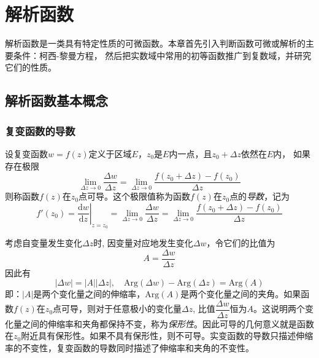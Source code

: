 \chapter{解析函数}
解析函数是一类具有特定性质的可微函数。本章首先引入判断函数可微或解析的主要条件：柯西-黎曼方程， 然后把实数域中常用的初等函数推广到复数域，并研究它们的性质。

\section{解析函数基本概念}\label{}

\subsection{复变函数的导数}

\begin{definition}
    \label{}\index{}
    设复变函数$w = f(z)$定义于区域$E$，$z_0$是$E$内一点，且$z_0 + \Delta z$依然在$E$内，
    如果存在极限
    \begin{equation}
        \lim_{\Delta z \to 0} \frac{\Delta w}{\Delta z}= \lim_{\Delta z \to 0}  \frac{f(z_0 +  \Delta z) - f(z_0)}{\Delta z}
    \end{equation}
   则称函数$f(z)$在$z_0$点可导。这个极限值称为函数$f(z)$在$z_0$点的\emph{导数}，记为
    \begin{equation}
        f'(z_0) = \left.\frac{\mathrm{d} w }{\mathrm{d} z} \right|_{z=z_0} = \lim_{\Delta z \to 0} \frac{\Delta w}{\Delta z}= \lim_{\Delta z \to 0}  \frac{f(z_0 +  \Delta z) - f(z_0)}{\Delta z}
    \end{equation}
\end{definition}
考虑自变量发生变化$\Delta z$时, 因变量对应地发生变化$\Delta w$，令它们的比值为
\[ A = \frac{\Delta w}{\Delta z}\]
因此有 
\[ |\Delta w| = |A| |\Delta z|, \quad \text{Arg}(\Delta w) -\text{Arg}(\Delta z) = \text{Arg}(A)  \]
即：$|A|$是两个变化量之间的伸缩率，$\text{Arg}(A) $是两个变化量之间的夹角。如果函数$f(z)$在$z_0$点可导，则对于任意极小的变化量$\Delta z$, 比值$\dfrac{\Delta w}{\Delta z}$恒为$A$。这说明两个变化量之间的伸缩率和夹角都保持不变，称为\emph{保形性}。因此可导的几何意义就是函数在$z_0$附近具有保形性。如果不具有保形性，则不可导。实变函数的导数只描述伸缩率的不变性，复变函数的导数同时描述了伸缩率和夹角的不变性。

